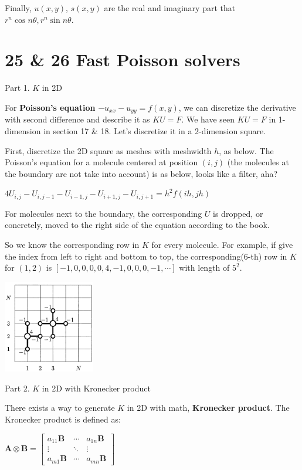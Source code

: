 \documentclass{article}
\newenvironment{nscenter}
{\parskip=0pt\par\nopagebreak\centering}
{\par\noindent\ignorespacesafterend}
\begin{document}
\begin{spacing}{1.5}
Finally, $u(x, y)$, $s(x, y)$ are the real and imaginary part that $r^n\cos n\theta, r^n\sin n\theta$.

\section*{25 \& 26 Fast Poisson solvers}
Part 1. $K$ in 2D

For {\bfseries Poisson's equation} $-u_{xx}-u_{yy}=f(x, y)$, we can discretize the derivative with second difference and describe it as $KU=F$. We have seen $KU=F$ in 1-dimension in section 17 \& 18. Let's discretize it in a 2-dimension square. 

First, discretize the 2D square as meshes with meshwidth $h$, as below. The Poisson's equation for a molecule centered at position $(i, j)$ (the molecules at the boundary are not take into account) is as below, looks like a filter, aha?
\begin{nscenter}
$4U_{i,j} - U_{i, j-1} - U_{i-1, j} - U_{i+1, j}- U_{i, j+1}=h^2f(ih, jh)$
\end{nscenter}
For molecules next to the boundary, the corresponding $U$ is dropped, or concretely, moved to the right side of the equation according to the book. 

So we know the corresponding row in $K$ for every molecule. For example, if give the index from left to right and bottom to top, the corresponding(6-th) row in $K$ for $(1, 2)$ is $[-1, 0, 0, 0, 0, 4, -1, 0 ,0, 0, -1, \cdots]$ with length of $5^2$.
\\\begin{center}
	\includegraphics[width=0.3\textwidth]{Poisson_mesh.png}
\end{center}
Part 2. $K$ in 2D with Kronecker product

There exists a way to generate $K$ in 2D with math, {\bfseries Kronecker product}. The Kronecker product is defined as:
\begin{nscenter}
	$\mathbf{A}\otimes\mathbf{B} = \begin{bmatrix} a_{11} \mathbf{B} & \cdots & a_{1n}\mathbf{B} \\ \vdots & \ddots & \vdots \\ a_{m1} \mathbf{B} & \cdots & a_{mn} \mathbf{B} \end{bmatrix}$
\end{nscenter}


\end{spacing}
\end{document}
